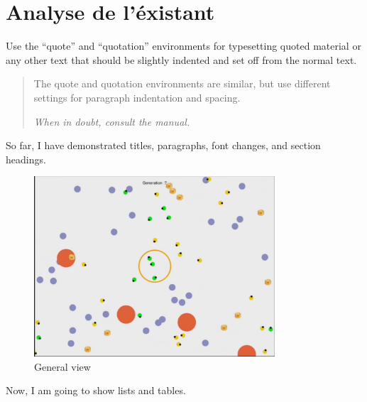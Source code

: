 \chapter{Analyse de l'éxistant}
Use the ``quote'' and ``quotation'' environments for typesetting quoted
material or any other text that should be slightly indented and set off
from the normal text.
\begin{quotation}
The quote and quotation environments are similar, but use different
settings for paragraph indentation and spacing.

\em When in doubt, consult the manual.
\end{quotation}

So far, I have demonstrated titles, paragraphs, font changes, and
section headings.

\begin{figure}[h!tb]
    \centering
    \includegraphics[width=0.8\textwidth]{./pictures/prototype.png}
    \caption{General view}
    \label{fig:awesome_image}
\end{figure}

Now, I am going to show lists and tables. 

\pagebreak
